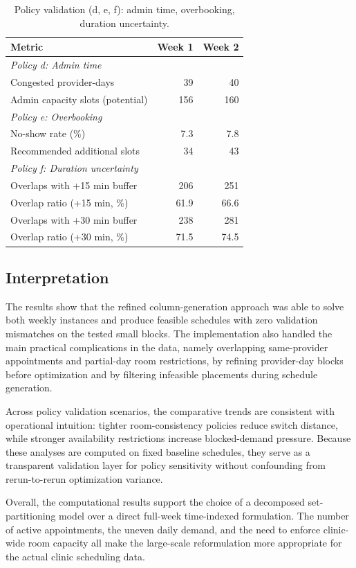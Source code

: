 \documentclass[12pt]{article}
\begin{document}
\begin{table}[h]
  \centering
  \caption{Policy validation (d, e, f): admin time, overbooking, duration uncertainty.}
  \label{tab:policy_def}
  \begin{tabular}{lrr}
    \toprule
    Metric & Week 1 & Week 2 \\
    \midrule
    \multicolumn{3}{l}{\textit{Policy d: Admin time}} \\
    Congested provider-days                    & 39    & 40    \\
    Admin capacity slots (potential)           & 156   & 160   \\
    \midrule
    \multicolumn{3}{l}{\textit{Policy e: Overbooking}} \\
    No-show rate (\%)                          & 7.3   & 7.8   \\
    Recommended additional slots               & 34    & 43    \\
    \midrule
    \multicolumn{3}{l}{\textit{Policy f: Duration uncertainty}} \\
    Overlaps with +15 min buffer               & 206   & 251   \\
    Overlap ratio (+15 min, \%)                & 61.9  & 66.6  \\
    Overlaps with +30 min buffer               & 238   & 281   \\
    Overlap ratio (+30 min, \%)                & 71.5  & 74.5  \\
    \bottomrule
  \end{tabular}
\end{table}

\subsection*{Interpretation}

The results show that the refined column-generation approach was able to solve both weekly
instances and produce feasible schedules with zero validation mismatches on the tested small
blocks. The implementation also handled the main practical complications in the data, namely
overlapping same-provider appointments and partial-day room restrictions, by refining
provider-day blocks before optimization and by filtering infeasible placements during schedule generation.

Across policy validation scenarios, the comparative trends are consistent with operational
intuition: tighter room-consistency policies reduce switch distance, while stronger availability
restrictions increase blocked-demand pressure. Because these analyses are computed on fixed
baseline schedules, they serve as a transparent validation layer for policy sensitivity without
confounding from rerun-to-rerun optimization variance.

Overall, the computational results support the choice of a decomposed set-partitioning model
over a direct full-week time-indexed formulation. The number of active appointments, the
uneven daily demand, and the need to enforce clinic-wide room capacity all make the large-scale
reformulation more appropriate for the actual clinic scheduling data.
\end{document}
